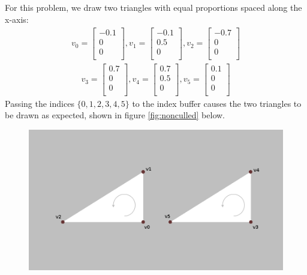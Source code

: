 \documentclass[]{article}
\begin{document}
\begin{multicols}{2}
\subsection{}
For this problem, we draw two triangles with equal proportions spaced along the x-axis:
\begin{equation}\begin{aligned}
v_0 =
\begin{bmatrix}
-0.1 \\
0 \\
0 \\
\end{bmatrix},
v_1 =
\begin{bmatrix}
-0.1 \\
0.5 \\
0 \\
\end{bmatrix},
v_2 =
\begin{bmatrix}
-0.7 \\
0 \\
0 \\
\end{bmatrix}
\end{aligned}\end{equation}
\begin{equation}\begin{aligned}
v_3 =
\begin{bmatrix}
0.7 \\
0 \\
0 \\
\end{bmatrix},
v_4 =
\begin{bmatrix}
0.7 \\
0.5 \\
0 \\
\end{bmatrix},
v_5 =
\begin{bmatrix}
0.1 \\
0 \\
0 \\
\end{bmatrix}
\end{aligned}\end{equation}
Passing the indices $\{0, 1, 2, 3, 4, 5\}$ to the index buffer causes the two triangles to be drawn as expected, shown in figure \ref{fig:nonculled} below.
\begin{figure}[H]
\centering
\includegraphics[width=\columnwidth]{culling1.png}

\end{figure}
\end{multicols}
\end{document}
